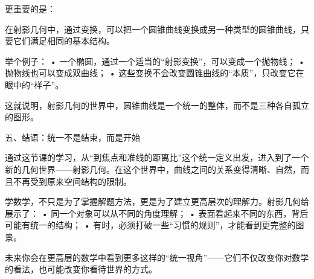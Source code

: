 更重要的是：

在射影几何中，通过变换，可以把一个圆锥曲线变换成另一种类型的圆锥曲线，只要它们满足相同的基本结构。

举个例子：
	•	一个椭圆，通过一个适当的“射影变换”，可以变成一个抛物线；
	•	抛物线也可以变成双曲线；
	•	这些变换不会改变圆锥曲线的“本质”，只改变它在眼中的“样子”。

这就说明，射影几何的世界中，圆锥曲线是一个统一的整体，而不是三种各自孤立的图形。

五、结语：统一不是结束，而是开始

通过这节课的学习，从“到焦点和准线的距离比”这个统一定义出发，进入到了一个新的几何世界——射影几何。在这个世界中，曲线之间的关系变得清晰、自然，而且不再受到原来空间结构的限制。

学数学，不只是为了掌握解题方法，更是为了建立更高层次的理解力。射影几何给展示了：
	•	同一个对象可以从不同的角度理解；
	•	表面看起来不同的东西，背后可能有统一的结构；
	•	有时，必须打破一些“习惯的规则”，才能看到更完整的图景。

未来你会在更高层的数学中看到更多这样的“统一视角”——它们不仅改变你对数学的看法，也可能改变你看待世界的方式。
